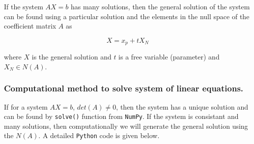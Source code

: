 \documentclass[
  letterpaper,
  DIV=11,
  numbers=noendperiod]{scrreprt}
\theoremstyle{plain}
\theoremstyle{definition}
\theoremstyle{remark}
\begin{document}
\begin{tcolorbox}[enhanced jigsaw, rightrule=.15mm, arc=.35mm, breakable, colback=white, toprule=.15mm, colframe=quarto-callout-note-color-frame, toptitle=1mm, opacityback=0, colbacktitle=quarto-callout-note-color!10!white, opacitybacktitle=0.6, title=\textcolor{quarto-callout-note-color}{\faInfo}\hspace{0.5em}{Use of Null space in creation of general solution from particular
solution}, bottomrule=.15mm, left=2mm, titlerule=0mm, coltitle=black, bottomtitle=1mm, leftrule=.75mm]

If the system \(AX=b\) has many solutions, then the general solution of
the system can be found using a particular solution and the elements in
the null space of the coefficient matrix \(A\) as

\[X=x_p+tX_N\]

where \(X\) is the general solution and \(t\) is a free variable
(parameter) and \(X_N\in N(A)\).

\end{tcolorbox}

\subsubsection{Computational method to solve system of linear
equations.}\label{computational-method-to-solve-system-of-linear-equations.}

If for a system \(AX=b\), \(det(A)\neq 0\), then the system has a unique
solution and can be found by \texttt{solve()} function from
\texttt{NumPy}. If the system is consistant and many solutions, then
computationally we will generate the general solution using the
\(N(A)\). A detailed \texttt{Python} code is given below.
\end{document}
